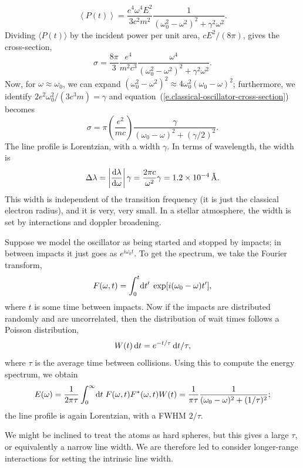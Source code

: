 \[
	\left\langle P(t)\right\rangle = \frac{e^{4}\omega^{4} E^{2}}{3 c^{2}m^{2}}
	\frac{1}{(\omega_{0}^{2}-\omega^{2})^{2} + \gamma^{2}\omega^{2}}.
\]
Dividing $\langle P(t)\rangle$ by the incident power per unit area, $cE^{2}/(8\pi)$, gives the cross-section,
\begin{equation}\label{e.classical-oscillator-cross-section}
	\sigma = \frac{8\pi}{3}\frac{e^{4}}{m^{2}c^{3}}
	\frac{\omega^{4}}{(\omega_{0}^{2}-\omega^{2})^{2} + \gamma^{2}\omega^{2}}.
\end{equation}
Now, for $\omega \approx \omega_{0}$, we can expand $(\omega_{0}^{2}-\omega^{2})^{2} \approx 4\omega_{0}^{2}(\omega_{0}-\omega)^{2}$; furthermore, we identify $2e^{2}\omega_{0}^{2}/(3c^{3}m) = \gamma$ and equation~(\ref{e.classical-oscillator-cross-section}) becomes
\begin{equation}\label{e.cross-section-lorenz}
	\sigma = \pi\left(\frac{e^{2}}{mc}\right)\frac{\gamma}{(\omega_{0}-\omega)^{2} + (\gamma/2)^{2}}.
\end{equation}
The line profile is Lorentzian, with a width $\gamma$. In terms of wavelength, the width is
\[ 
	\Delta \lambda = \left|\frac{\mathrm{d}\lambda}{\mathrm{d}\omega}\right|\gamma = \frac{2\pi c}{\omega^{2}}\gamma
	= 1.2\times 10^{-4}\,\textrm{\AA}.
\]
This width is independent of the transition frequency (it is just the classical electron radius), and it is very, very small.  In a stellar atmosphere, the width is set by interactions and doppler broadening.

Suppose we model the oscillator as being started and stopped by impacts; in between impacts it just goes as $e^{i\omega_{0}t}$.  To get the spectrum, we take the Fourier transform,
\[
	F(\omega,t) = \int_{0}^{t}\!\mathrm{d} t'\; \exp[i(\omega_{0}-\omega)t'],
\]
where $t$ is some time between impacts. Now if the impacts are distributed randomly and are uncorrelated, then the distribution of wait times follows a Poisson distribution,
\[ W(t)\,\mathrm{d} t = e^{-t/\tau}\,\mathrm{d} t/\tau, \]
where $\tau$ is the average time between collisions.  Using this to compute the energy spectrum, we obtain
\[ E(\omega) = \frac{1}{2\pi\tau}\int_{0}^{\infty}\!\mathrm{d} t\; F(\omega,t)F^{*}(\omega,t)W(t) = \frac{1}{\pi\tau} 
	\frac{1}{(\omega_{0}-\omega)^{2} + (1/\tau)^{2}};
\]
the line profile is again Lorentzian, with a FWHM $2/\tau$.

We might be inclined to treat the atoms as hard spheres, but this gives a large $\tau$, or equivalently a narrow line width. We are therefore led to consider longer-range interactions for setting the intrinsic line width.

